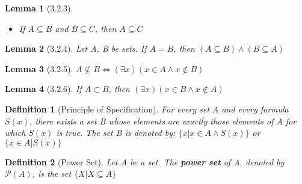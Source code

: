 \documentclass[12pt, letterpaper]{article}
\theoremstyle{plain}
\newtheorem*{lemma*}{Lemma}
\newtheorem*{definition*}{Definition}
\begin{document}
\begin{mdframed}[leftmargin=0.01cm, rightmargin=0.01cm]
\begin{lemma*}[3.2.3]
\begin{itemize}
                \item[(iii)] If $A \subseteq B$ and $B \subseteq C$, then $A \subseteq C$  
            \end{itemize}
        \end{lemma*}
        \begin{lemma*}[3.2.4]
            Let A, B be sets. If $A = B$, then $(A \subseteq B) \wedge (B \subseteq A)$
        \end{lemma*}
        \begin{lemma*}[3.2.5]
            $A \nsubseteq B \Leftrightarrow (\exists x)(x \in A \wedge x \notin B)$
        \end{lemma*}
        \begin{lemma*}[3.2.6]
            If $A \subset B$, then $(\exists x)(x \in B \wedge x \notin A)$
        \end{lemma*}
        \begin{definition*}[Principle of Specification]
            For every set A and every formula $S(x)$, there exists a set B whose elements are exactly those elements of A for which $S(x)$ is true. The set B is denoted by:
            $\{ x | x \in A \wedge S(x) \}$ or $\{x \in A | S(x) \}$
        \end{definition*}
        \begin{definition*}[Power Set]
            Let A be a set. The \textbf{power set} of A, denoted by $\mathcal{P}(A)$, is the set $\{ X | X \subseteq A \}$
        \end{definition*}
    \end{mdframed}
\newpage
\end{document}
